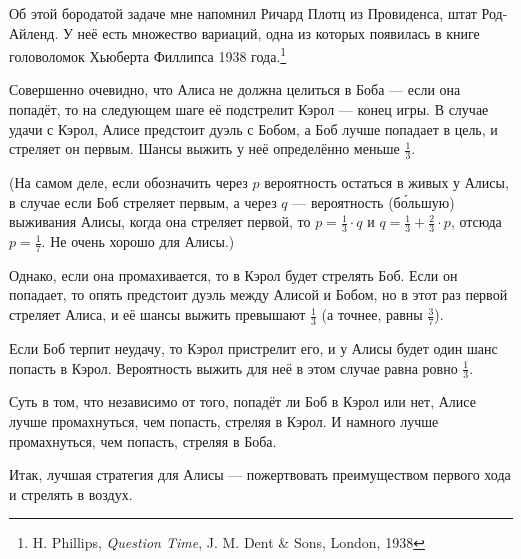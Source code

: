 Об этой бородатой задаче мне напомнил Ричард Плотц из Провиденса, штат Род-Айленд.
У неё есть множество вариаций, одна из которых появилась в книге головоломок Хьюберта Филлипса 1938 года.\footnote{H. Phillips, \emph{Question Time},  J. M. Dent \& Sons, London, 1938}

\medskip

Совершенно очевидно, что Алиса не должна целиться в Боба --- если она попадёт, то на следующем шаге её подстрелит Кэрол --- конец игры.
В случае удачи с Кэрол, Алисе предстоит дуэль с Бобом, а Боб лучше попадает в цель, и стреляет он первым.
Шансы выжить у неё определённо меньше $\tfrac13$.

(На самом деле, если обозначить через $p$ вероятность остаться в живых у Алисы, в случае если Боб стреляет первым, а через $q$ --- вероятность (б\'{о}льшую) выживания Алисы, когда она стреляет первой, то $p=\tfrac13\cdot q$ и $q=\tfrac13+\tfrac23\cdot p$, отсюда $p=\tfrac17$.
Не очень хорошо для Алисы.)

Однако, если она промахивается, то в Кэрол будет стрелять Боб.
Если он попадает, то опять предстоит дуэль между Алисой и Бобом, но в этот раз первой стреляет Алиса, и её шансы выжить превышают $\tfrac13$ (а точнее, равны $\tfrac37$).

Если Боб терпит неудачу, то Кэрол пристрелит его, и у Алисы будет один шанс попасть в Кэрол.
Вероятность выжить для неё в этом случае равна ровно $\tfrac13$.

Суть в том, что независимо от того, попадёт ли Боб в Кэрол или нет, Алисе лучше промахнуться, чем попасть, стреляя в Кэрол.
И намного лучше промахнуться, чем попасть, стреляя в Боба.

Итак, лучшая стратегия для Алисы --- пожертвовать преимуществом первого хода и стрелять в воздух.

\medskip

